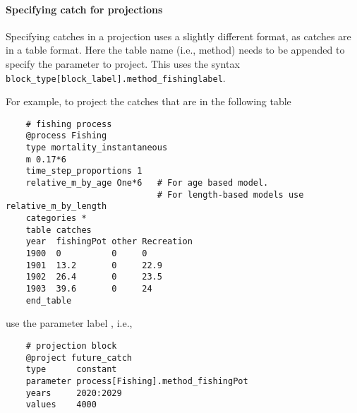 
\paragraph[Catches]{Specifying catch for projections }\label{sec:Project-Catch}

Specifying catches in a projection uses a slightly different format, as catches are in a table format. Here the table name (i.e., method) needs to be appended to specify the parameter to project. This uses the syntax \texttt{block\_type[block\_label].method\_fishinglabel}. 

For example, to project the  catches that are in the following table

{\small{\begin{verbatim}
	# fishing process
	@process Fishing
	type mortality_instantaneous
	m 0.17*6
	time_step_proportions 1
	relative_m_by_age One*6   # For age based model. 
	                          # For length-based models use relative_m_by_length
	categories *
	table catches
	year  fishingPot other Recreation
	1900  0          0     0
	1901  13.2       0     22.9
	1902  26.4       0     23.5
	1903  39.6       0     24
	end_table
\end{verbatim}}}

use the parameter label	, i.e., 

{\small{\begin{verbatim}
	# projection block
	@project future_catch
	type      constant
	parameter process[Fishing].method_fishingPot
	years     2020:2029
	values    4000
\end{verbatim}}}

